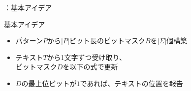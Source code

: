 \documentclass[dvipdfmx,12pt,beamer]{standalone}
\begin{document}
\begin{frame}{\ShiftAnd：基本アイデア}
	\begin{block}{基本アイデア}	
		\begin{itemize}
			\item パターン$P$から$|P|$ビット長のビットマスク$B$を$|\Sigma|$個構築
			\item テキスト$T$から1文字ずつ受け取り、\\ビットマスク$D$を以下の式で更新
			\item $D$の最上位ビットが$1$であれば、テキストの位置を報告
		\end{itemize}
	\end{block}
\end{frame}
\end{document}

